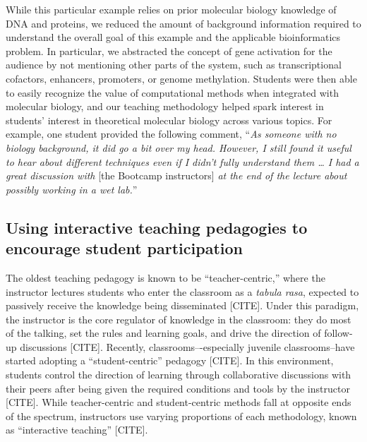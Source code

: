 While this particular example relies on prior molecular biology knowledge of DNA and proteins, we reduced the amount of background information required to understand the overall goal of this example and the applicable bioinformatics problem. In particular, we abstracted the concept of gene activation for the audience by not mentioning other parts of the system, such as transcriptional cofactors, enhancers, promoters, or genome methylation. Students were then able to easily recognize the value of computational methods when integrated with molecular biology, and our teaching methodology helped spark interest in students’ interest in theoretical molecular biology across various topics. For example, one student provided the following comment, “\textit{As someone with no biology background, it did go a bit over my head. However, I still found it useful to hear about different techniques even if I didn't fully understand them … I had a great discussion with} [the Bootcamp instructors] \textit{at the end of the lecture about possibly working in a wet lab.}” 

\subsection{Using interactive teaching pedagogies to encourage student participation} 

The oldest teaching pedagogy is known to be “teacher-centric,” where the instructor lectures students who enter the classroom as a \textit{tabula rasa}, expected to passively receive the knowledge being disseminated [CITE]. Under this paradigm, the instructor is the core regulator of knowledge in the classroom: they do most of the talking, set the rules and learning goals, and drive the direction of follow-up discussions [CITE]. Recently, classrooms–-especially juvenile classrooms--have started adopting a “student-centric” pedagogy [CITE]. In this environment, students control the direction of learning through collaborative discussions with their peers after being given the required conditions and tools by the instructor [CITE]. While teacher-centric and student-centric methods fall at opposite ends of the spectrum, instructors use varying proportions of each methodology, known as “interactive teaching” [CITE].

